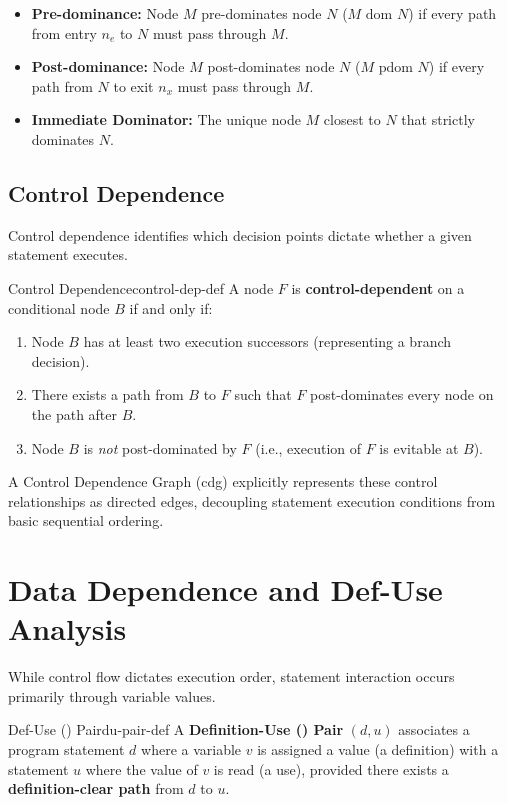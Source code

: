 \begin{itemize}
    \item \textbf{Pre-dominance:} Node $M$ pre-dominates node $N$ ($M \text{ dom } N$) if every path from entry $n_e$ to $N$ must pass through $M$.
    \item \textbf{Post-dominance:} Node $M$ post-dominates node $N$ ($M \text{ pdom } N$) if every path from $N$ to exit $n_x$ must pass through $M$.
    \item \textbf{Immediate Dominator:} The unique node $M$ closest to $N$ that strictly dominates $N$.
\end{itemize}

\subsection{Control Dependence}
Control dependence identifies which decision points dictate whether a given statement executes.

\begin{definition}{Control Dependence}{control-dep-def}
A node $F$ is \textbf{control-dependent} on a conditional node $B$ if and only if:
\begin{enumerate}
    \item Node $B$ has at least two execution successors (representing a branch decision).
    \item There exists a path from $B$ to $F$ such that $F$ post-dominates every node on the path after $B$.
    \item Node $B$ is \textit{not} post-dominated by $F$ (i.e., execution of $F$ is evitable at $B$).
\end{enumerate}
\end{definition}

A Control Dependence Graph (\gls{cdg}) explicitly represents these control relationships as directed edges, decoupling statement execution conditions from basic sequential ordering.

\section{Data Dependence and Def-Use Analysis}
\label{sec:data_dependence}

While control flow dictates execution order, statement interaction occurs primarily through variable values.

\begin{definition}{Def-Use () Pair}{du-pair-def}
A \textbf{Definition-Use () Pair} $(d, u)$ associates a program statement $d$ where a variable $v$ is assigned a value (a definition) with a statement $u$ where the value of $v$ is read (a use), provided there exists a \textbf{definition-clear path} from $d$ to $u$.
\end{definition}

